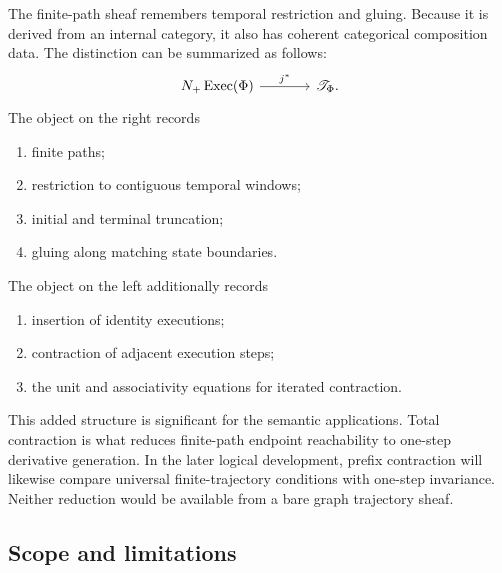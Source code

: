 The finite-path sheaf remembers temporal restriction and gluing. Because it is
derived from an internal category, it also has coherent categorical
composition data. The distinction can be summarized as follows:
\[
\begin{tikzcd}[column sep=large]
    N_+\operatorname{Exec}(\Phi)
        \arrow[r, "{j^\ast}"]
    &
    \mathscr T_\Phi.
\end{tikzcd}
\]
The object on the right records
\begin{enumerate}
    \item finite paths;
    \item restriction to contiguous temporal windows;
    \item initial and terminal truncation;
    \item gluing along matching state boundaries.
\end{enumerate}
The object on the left additionally records
\begin{enumerate}
    \item insertion of identity executions;
    \item contraction of adjacent execution steps;
    \item the unit and associativity equations for iterated contraction.
\end{enumerate}

This added structure is significant for the semantic applications.  Total
contraction is what reduces finite-path endpoint reachability to one-step
derivative generation.  In the later logical development, prefix contraction
will likewise compare universal finite-trajectory conditions with one-step
invariance.  Neither reduction would be available from a bare graph
trajectory sheaf.

\subsection{Scope and limitations}
\label{subsec:limitations-temporal-trajectories}

